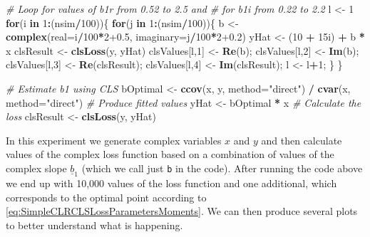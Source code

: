 \documentclass[
]{book}
\newenvironment{Shaded}{\begin{snugshade}}{\end{snugshade}}
\newcommand{\CommentTok}[1]{\textcolor[rgb]{0.56,0.35,0.01}{\textit{#1}}}
\newcommand{\ControlFlowTok}[1]{\textcolor[rgb]{0.13,0.29,0.53}{\textbf{#1}}}
\newcommand{\DataTypeTok}[1]{\textcolor[rgb]{0.13,0.29,0.53}{#1}}
\newcommand{\DecValTok}[1]{\textcolor[rgb]{0.00,0.00,0.81}{#1}}
\newcommand{\FloatTok}[1]{\textcolor[rgb]{0.00,0.00,0.81}{#1}}
\newcommand{\KeywordTok}[1]{\textcolor[rgb]{0.13,0.29,0.53}{\textbf{#1}}}
\newcommand{\NormalTok}[1]{#1}
\newcommand{\OperatorTok}[1]{\textcolor[rgb]{0.81,0.36,0.00}{\textbf{#1}}}
\newcommand{\StringTok}[1]{\textcolor[rgb]{0.31,0.60,0.02}{#1}}
\begin{document}
\begin{Shaded}
\begin{Highlighting}[]
\CommentTok{\# Loop for values of b1r from 0.52 to 2.5 and}
\CommentTok{\# for b1i from 0.22 to 2.2}
\NormalTok{l \textless{}{-}}\StringTok{ }\DecValTok{1}
\ControlFlowTok{for}\NormalTok{(i }\ControlFlowTok{in} \DecValTok{1}\OperatorTok{:}\NormalTok{(nsim}\OperatorTok{/}\DecValTok{100}\NormalTok{))\{}
    \ControlFlowTok{for}\NormalTok{(j }\ControlFlowTok{in} \DecValTok{1}\OperatorTok{:}\NormalTok{(nsim}\OperatorTok{/}\DecValTok{100}\NormalTok{))\{}
\NormalTok{        b \textless{}{-}}\StringTok{ }\KeywordTok{complex}\NormalTok{(}\DataTypeTok{real=}\NormalTok{i}\OperatorTok{/}\DecValTok{100}\OperatorTok{*}\DecValTok{2}\FloatTok{+0.5}\NormalTok{, }\DataTypeTok{imaginary=}\NormalTok{j}\OperatorTok{/}\DecValTok{100}\OperatorTok{*}\DecValTok{2}\FloatTok{+0.2}\NormalTok{)}
\NormalTok{        yHat \textless{}{-}}\StringTok{ }\NormalTok{(}\DecValTok{10} \OperatorTok{+}\StringTok{ }\NormalTok{15i) }\OperatorTok{+}\StringTok{ }\NormalTok{b }\OperatorTok{*}\StringTok{ }\NormalTok{x}
\NormalTok{        clsResult \textless{}{-}}\StringTok{ }\KeywordTok{clsLoss}\NormalTok{(y, yHat)}
\NormalTok{        clsValues[l,}\DecValTok{1}\NormalTok{] \textless{}{-}}\StringTok{ }\KeywordTok{Re}\NormalTok{(b);}
\NormalTok{        clsValues[l,}\DecValTok{2}\NormalTok{] \textless{}{-}}\StringTok{ }\KeywordTok{Im}\NormalTok{(b);}
\NormalTok{        clsValues[l,}\DecValTok{3}\NormalTok{] \textless{}{-}}\StringTok{ }\KeywordTok{Re}\NormalTok{(clsResult);}
\NormalTok{        clsValues[l,}\DecValTok{4}\NormalTok{] \textless{}{-}}\StringTok{ }\KeywordTok{Im}\NormalTok{(clsResult);}
\NormalTok{        l \textless{}{-}}\StringTok{ }\NormalTok{l}\OperatorTok{+}\DecValTok{1}\NormalTok{;}
\NormalTok{    \}}
\NormalTok{\}}

\CommentTok{\# Estimate b1 using CLS}
\NormalTok{bOptimal \textless{}{-}}\StringTok{ }\KeywordTok{ccov}\NormalTok{(x, y, }\DataTypeTok{method=}\StringTok{"direct"}\NormalTok{) }\OperatorTok{/}
\StringTok{            }\KeywordTok{cvar}\NormalTok{(x, }\DataTypeTok{method=}\StringTok{"direct"}\NormalTok{)}
\CommentTok{\# Produce fitted values}
\NormalTok{yHat \textless{}{-}}\StringTok{ }\NormalTok{bOptimal }\OperatorTok{*}\StringTok{ }\NormalTok{x}
\CommentTok{\# Calculate the loss}
\NormalTok{clsResult \textless{}{-}}\StringTok{ }\KeywordTok{clsLoss}\NormalTok{(y, yHat)}
\end{Highlighting}
\end{Shaded}

In this experiment we generate complex variables \(x\) and \(y\) and then calculate values of the complex loss function based on a combination of values of the complex slope \(\underline{b}_1\) (which we call just \texttt{b} in the code). After running the code above we end up with 10,000 values of the loss function and one additional, which corresponds to the optimal point according to \eqref{eq:SimpleCLRCLSLossParametersMoments}. We can then produce several plots to better understand what is happening.
\end{document}

